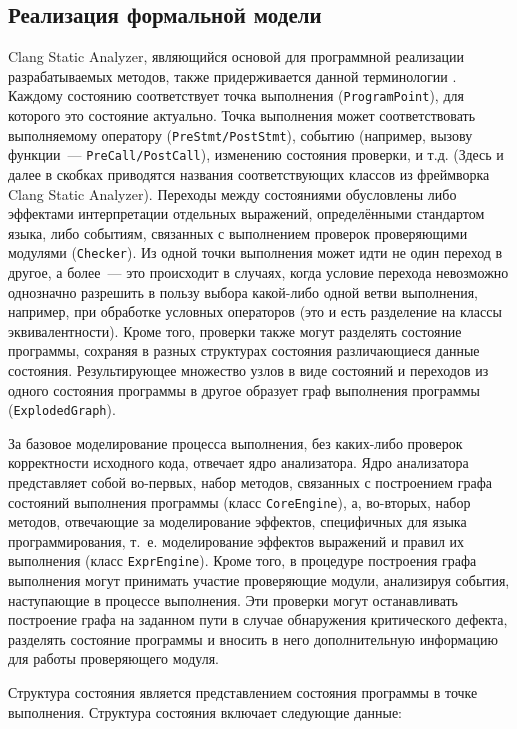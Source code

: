 \subsection{Реализация формальной модели}

Clang Static Analyzer, являющийся основой для программной реализации разрабатываемых методов, также придерживается данной терминологии \cite{csa-base}. Каждому состоянию соответствует точка выполнения (\texttt{ProgramPoint}), для которого это состояние актуально. Точка выполнения может соответствовать выполняемому оператору (\texttt{PreStmt/PostStmt}), событию (например, вызову функции~--- \texttt{PreCall/PostCall}), изменению состояния проверки, и т.д. (Здесь и далее в скобках приводятся названия соответствующих классов из фреймворка Clang Static Analyzer). Переходы между состояниями обусловлены либо эффектами интерпретации отдельных выражений, определёнными стандартом языка, либо событиям, связанных с выполнением проверок проверяющими модулями (\texttt{Checker}). Из одной точки выполнения может идти не один переход в другое, а более~--- это происходит в случаях, когда условие перехода невозможно однозначно разрешить в пользу выбора какой-либо одной ветви выполнения, например, при обработке условных операторов (это и есть разделение на классы эквивалентности). Кроме того, проверки также могут разделять состояние программы, сохраняя в разных структурах состояния различающиеся данные состояния. Результирующее множество узлов в виде состояний и переходов из одного состояния программы в другое образует граф выполнения программы (\texttt{ExplodedGraph}).

За базовое моделирование процесса выполнения, без каких-либо проверок корректности исходного кода, отвечает ядро анализатора. Ядро анализатора представляет собой во-первых, набор методов, связанных с построением графа состояний выполнения программы (класс \texttt{CoreEngine}), а, во-вторых, набор методов, отвечающие за моделирование эффектов, специфичных для языка программирования, т.~е. моделирование эффектов выражений и правил их выполнения (класс \texttt{ExprEngine}). Кроме того, в процедуре построения графа выполнения могут принимать участие проверяющие модули, анализируя события, наступающие в процессе выполнения. Эти проверки могут останавливать построение графа на заданном пути в случае обнаружения критического дефекта, разделять состояние программы и вносить в него дополнительную информацию для работы проверяющего модуля.

Структура состояния является представлением состояния программы в точке выполнения. Структура состояния включает следующие данные:

